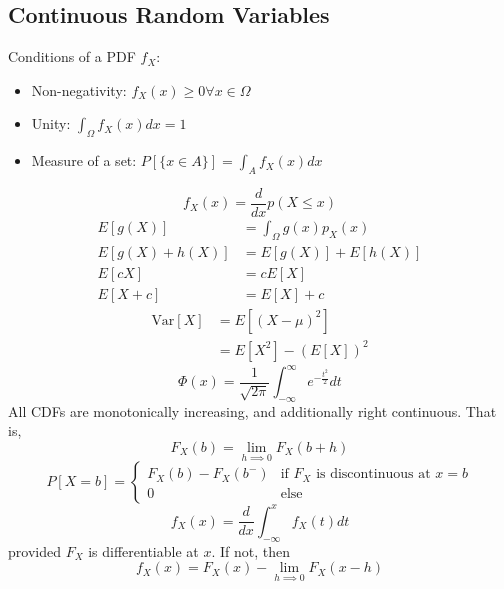 \documentclass[nobib]{tufte-handout}
\begin{document}
\subsection{Continuous Random Variables}
Conditions of a PDF $f_X$:
\begin{itemize}
    \item Non-negativity: $f_X(x) \geq 0 \forall x \in \Omega$
    \item Unity: $\int_{\Omega} f_X(x)dx = 1$
    \item Measure of a set: $P[\{x \in A\}] = \int_{A}f_X(x) dx$
\end{itemize}
\begin{equation}
    f_X(x) = \frac{d}{dx}p(X \leq x)
\end{equation}
\begin{align}
    E[g(X)]        & = \int_{\Omega} g(x)p_X(x) \\
    E[g(X) + h(X)] & = E[g(X)] + E[h(X)]        \\
    E[cX]          & = cE[X]                    \\
    E[X + c]       & = E[X] + c
\end{align}
\begin{align}
    \text{Var}[X] & = E\left[(X-\mu)^2\right] \\
                  & = E[X^2] - (E[X])^2
\end{align}
\begin{equation}
    \Phi(x) = \frac{1}{\sqrt{2\pi}}\int_{-\infty}^{\infty} e^{-\frac{t^2}{2}}dt
\end{equation}
All CDFs are monotonically increasing, and additionally right continuous. That is,
\begin{equation}
    F_X(b) = \lim_{h\implies 0} F_X(b+h)
\end{equation}
\begin{equation}
    P[X=b] = \begin{cases}
        F_X(b) - F_X(b^-) & \text{if $F_X$ is discontinuous at $x=b$} \\
        0                 & \text{else}
    \end{cases}
\end{equation}
\begin{equation}
    f_X(x) = \frac{d}{dx} \int_{-\infty}^{x} f_X(t)dt
\end{equation}
provided $F_X$ is differentiable at $x$. If not, then
\begin{equation}
    f_X(x) = F_X(x) - \lim_{h\implies 0} F_X(x-h)
\end{equation}
\end{document}
